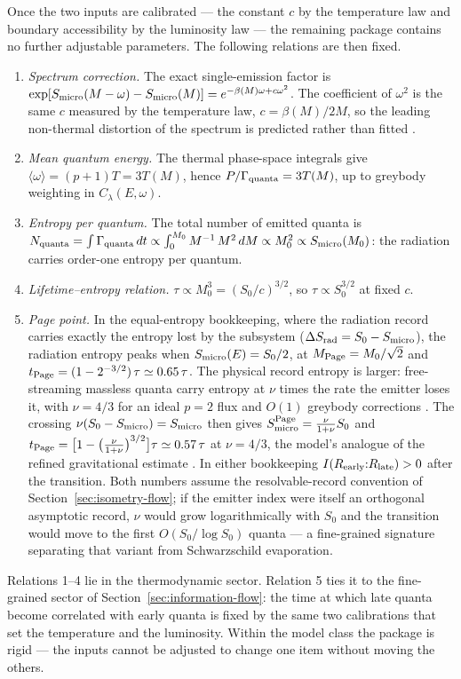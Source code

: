 \documentclass[12pt]{article}
\newcommand{\Smicro}{S_{\rm micro}}
\begin{document}
Once the two inputs are calibrated --- the constant $c$ by the temperature
law and boundary accessibility by the luminosity law --- the remaining
package contains no further adjustable parameters.  The following relations
are then fixed.
\begin{enumerate}
\item
\emph{Spectrum correction.}  The exact single-emission factor is
$\exp[\Smicro(M-\omega)-\Smicro(M)]=e^{-\beta(M)\omega+c\omega^2}$.  The
coefficient of $\omega^2$ is the same $c$ measured by the temperature law,
$c=\beta(M)/2M$, so the leading non-thermal distortion of the spectrum is
predicted rather than fitted \cite{ParikhWilczek2000}.
\item
\emph{Mean quantum energy.}  The thermal phase-space integrals give
$\langle\omega\rangle=(p+1)T=3T(M)$, hence
$P/\Gamma_{\rm quanta}=3T(M)$, up to greybody weighting in
$C_\lambda(E,\omega)$.
\item
\emph{Entropy per quantum.}  The total number of emitted quanta is
$N_{\rm quanta}=\int\Gamma_{\rm quanta}\,dt
\propto\int_0^{M_0}M^{-1}\,M^2\,dM\propto M_0^2\propto\Smicro(M_0)$:
the radiation carries order-one entropy per quantum.
\item
\emph{Lifetime--entropy relation.}  $\tau\propto M_0^3=(S_0/c)^{3/2}$, so
$\tau\propto S_0^{3/2}$ at fixed $c$.
\item
\emph{Page point.}  In the equal-entropy bookkeeping, where the radiation
record carries exactly the entropy lost by the subsystem
($\Delta S_{\rm rad}=S_0-\Smicro$), the radiation entropy peaks when
$\Smicro(E)=S_0/2$, at $M_{\rm Page}=M_0/\sqrt2$ and
$t_{\rm Page}=(1-2^{-3/2})\,\tau\simeq0.65\,\tau$.  The physical record
entropy is larger: free-streaming massless quanta carry entropy at $\nu$
times the rate the emitter loses it, with $\nu=4/3$ for an ideal $p=2$
flux \cite{Zurek1982} and $O(1)$ greybody corrections \cite{Page1976}.
The crossing $\nu(S_0-\Smicro)=\Smicro$ then gives
$\Smicro^{\rm Page}=\frac{\nu}{1+\nu}S_0$ and
$t_{\rm Page}=\bigl[1-\bigl(\tfrac{\nu}{1+\nu}\bigr)^{3/2}\bigr]\tau
\simeq0.57\,\tau$ at $\nu=4/3$, the model's analogue of the refined
gravitational estimate \cite{Page2013}.  In either bookkeeping
$I(R_{\rm early}{:}R_{\rm late})>0$ after the transition.  Both numbers
assume the resolvable-record convention of
Section~\ref{sec:isometry-flow}; if the emitter index were itself an
orthogonal asymptotic record, $\nu$ would grow logarithmically with $S_0$
and the transition would move to the first $O(S_0/\log S_0)$ quanta --- a
fine-grained signature separating that variant from Schwarzschild
evaporation.
\end{enumerate}
Relations 1--4 lie in the thermodynamic sector.  Relation 5 ties it to the
fine-grained sector of Section~\ref{sec:information-flow}: the time at which
late quanta become correlated with early quanta is fixed by the same two
calibrations that set the temperature and the luminosity.  Within the model
class the package is rigid --- the inputs cannot be adjusted to change one
item without moving the others.
\end{document}
